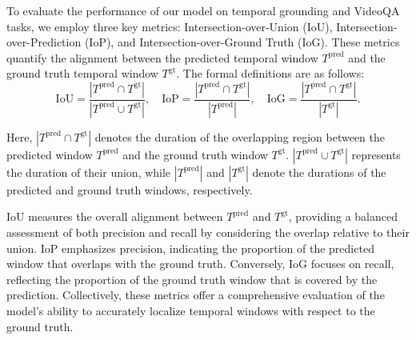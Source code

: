 

To evaluate the performance of our model on temporal grounding and VideoQA tasks, we employ three key metrics: Intersection-over-Union (IoU), Intersection-over-Prediction (IoP), and Intersection-over-Ground Truth (IoG). These metrics quantify the alignment between the predicted temporal window \( T^{\text{pred}} \) and the ground truth temporal window \( T^{\text{gt}} \). The formal definitions are as follows:
\begin{equation*}
    \text{IoU} = \frac{|T^{\text{pred}} \cap T^{\text{gt}}|}{|T^{\text{pred}} \cup T^{\text{gt}}|}, \quad
    \text{IoP} = \frac{|T^{\text{pred}} \cap T^{\text{gt}}|}{|T^{\text{pred}}|}, \quad
    \text{IoG} = \frac{|T^{\text{pred}} \cap T^{\text{gt}}|}{|T^{\text{gt}}|}.
\end{equation*}

Here, \( |T^{\text{pred}} \cap T^{\text{gt}}| \) denotes the duration of the overlapping region between the predicted window \( T^{\text{pred}} \) and the ground truth window \( T^{\text{gt}} \). \( |T^{\text{pred}} \cup T^{\text{gt}}| \) represents the duration of their union, while \( |T^{\text{pred}}| \) and \( |T^{\text{gt}}| \) denote the durations of the predicted and ground truth windows, respectively.

IoU measures the overall alignment between \( T^{\text{pred}} \) and \( T^{\text{gt}} \), providing a balanced assessment of both precision and recall by considering the overlap relative to their union. IoP emphasizes precision, indicating the proportion of the predicted window that overlaps with the ground truth. Conversely, IoG focuses on recall, reflecting the proportion of the ground truth window that is covered by the prediction. Collectively, these metrics offer a comprehensive evaluation of the model's ability to accurately localize temporal windows with respect to the ground truth.

